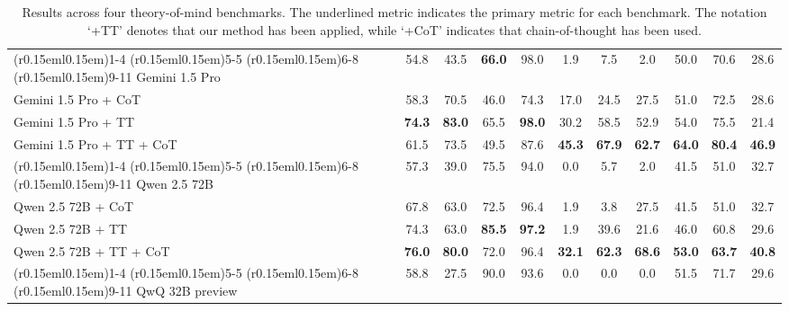 \begin{table*}[t!]
\begin{adjustbox}{width=\linewidth}
\begin{tabular}{lccc|c|ccc|ccc}
    \\
    \cmidrule(r{0.15em}l{0.15em}){1-4} \cmidrule(r{0.15em}l{0.15em}){5-5}  \cmidrule(r{0.15em}l{0.15em}){6-8}  \cmidrule(r{0.15em}l{0.15em}){9-11}
    Gemini 1.5 Pro     
    & 54.8  & 43.5  & \textbf{66.0}
    & 98.0 
    & 1.9   & 7.5   & 2.0
    & 50.0  & 70.6     & 28.6
    \\
    Gemini 1.5 Pro + CoT
    & 58.3  & 70.5  & 46.0  
    & 74.3 
    & 17.0  & 24.5  & 27.5
    & 51.0  & 72.5     & 28.6
    \\
    Gemini 1.5 Pro + TT
    & \textbf{74.3}  & \textbf{83.0}  & 65.5  
    & \textbf{98.0} 
    & 30.2  & 58.5  & 52.9
    & 54.0  & 75.5     & 21.4
    \\
    Gemini 1.5 Pro + TT + CoT
    & 61.5  & 73.5  & 49.5  
    & 87.6 
    & \textbf{45.3}  & \textbf{67.9}  & \textbf{62.7}
    & \textbf{64.0}     & \textbf{80.4}     & \textbf{46.9}
    \\
    \cmidrule(r{0.15em}l{0.15em}){1-4} \cmidrule(r{0.15em}l{0.15em}){5-5}  \cmidrule(r{0.15em}l{0.15em}){6-8}  \cmidrule(r{0.15em}l{0.15em}){9-11}
    Qwen 2.5 72B       
    & 57.3  & 39.0  & 75.5  
    & 94.0 
    & 0.0   & 5.7   & 2.0
    & 41.5     & 51.0     & 32.7
    \\
    Qwen 2.5 72B + CoT 
    & 67.8  & 63.0  & 72.5  
    & 96.4 
    & 1.9   & 3.8   & 27.5
    & 41.5  & 51.0     & 32.7
    \\
    Qwen 2.5 72B + TT  
    & 74.3  & 63.0  & \textbf{85.5}
    & \textbf{97.2} 
    & 1.9   & 39.6  & 21.6
    & 46.0  & 60.8    & 29.6
    \\
    Qwen 2.5 72B + TT + CoT
    & \textbf{76.0}  & \textbf{80.0}  & 72.0  
    & 96.4 
    & \textbf{32.1}  & \textbf{62.3}  & \textbf{68.6}
    & \textbf{53.0}     & \textbf{63.7}     & \textbf{40.8}
    \\
    \cmidrule(r{0.15em}l{0.15em}){1-4} \cmidrule(r{0.15em}l{0.15em}){5-5}  \cmidrule(r{0.15em}l{0.15em}){6-8}  \cmidrule(r{0.15em}l{0.15em}){9-11}
    QwQ 32B preview     
    & 58.8  & 27.5  & 90.0  
    & 93.6 
    & 0.0   & 0.0   & 0.0
    & 51.5  & 71.7     & 29.6
    \\
    \bottomrule
    \end{tabular}
    \end{adjustbox}
    \vspace{-0.5em}
    \caption{
    Results across four theory-of-mind benchmarks. 
    The underlined metric indicates the primary metric for each benchmark.
    The notation `+TT' denotes that our \tracing method has been applied, while `+CoT' indicates that chain-of-thought has been used.
    }
    \vspace{-1em}
    \label{tab:scores}
\end{table*}
